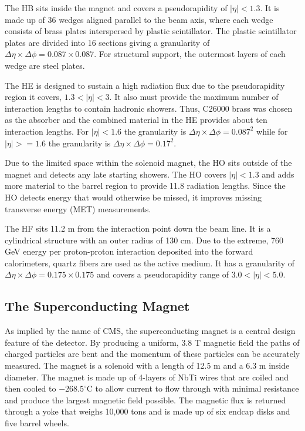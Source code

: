 The HB sits inside the magnet and covers a pseudorapidity of $|\eta| < 1.3$. It is made up of 36 wedges aligned parallel to the beam axis, where each wedge consists of brass plates interspersed by plastic scintillator. The plastic scintillator plates are divided into 16 sections giving a granularity of $\Delta\eta \times \Delta\phi = 0.087 \times 0.087$. For structural support, the outermost layers of each wedge are steel plates.

The HE is designed to sustain a high radiation flux due to the pseudorapidity region it covers, $1.3 < |\eta| < 3$. It also must provide the maximum number of interaction lengths to contain hadronic showers. Thus, C26000 brass was chosen as the absorber and the combined material in the HE provides about ten interaction lengths. For $|\eta| < 1.6$ the granularity is $\Delta\eta \times \Delta\phi = 0.087^{2}$ while for $|\eta| >= 1.6$ the granularity is $\Delta\eta \times \Delta\phi = 0.17^{2}$. 

Due to the limited space within the solenoid magnet, the HO sits outside of the magnet and detects any late starting showers. The HO covers $|\eta| < 1.3$ and adds more material to the barrel region to provide 11.8 radiation lengths. Since the HO detects energy that would otherwise be missed, it improves missing transverse energy (MET) measurements.

 The HF sits 11.2 m from the interaction point down the beam line. It is a cylindrical structure with an outer radius of 130 cm. Due to the extreme, 760 GeV energy per proton-proton interaction deposited into the forward calorimeters, quartz fibers are used as the active medium. It has a granularity of $\Delta\eta \times \Delta\phi = 0.175\times 0.175$ and covers a pseudorapidity range of $3.0 < |\eta| < 5.0$.

\subsection{The Superconducting Magnet}

As implied by the name of CMS, the superconducting magnet is a central design feature of the detector. By producing a uniform, 3.8 T magnetic field the paths of charged particles are bent and the momentum of these particles can be accurately measured. The magnet is a solenoid with a length of 12.5 m and a 6.3 m inside diameter. The magnet is made up of 4-layers of NbTi wires that are coiled and then cooled to $-268.5^{\circ}$C to allow current to flow through with minimal resistance and produce the largest magnetic field possible. The magnetic flux is returned through a yoke that weighs 10,000 tons and is made up of six endcap disks and five barrel wheels.

